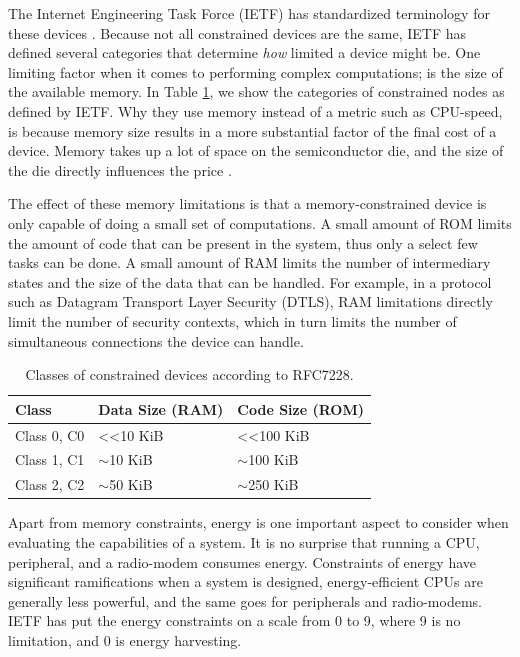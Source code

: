 The Internet Engineering Task Force (IETF) has standardized terminology for these devices \cite{rfc7228}. Because not all constrained devices are the same, IETF has defined several categories that determine \emph{how} limited a device might be. One limiting factor when it comes to performing complex computations; is the size of the available memory. In Table \ref{tab:constrained-classes}, we show the categories of constrained nodes as defined by IETF. Why they use memory instead of a metric such as CPU-speed, is because memory size results in a more substantial factor of the final cost of a device. Memory takes up a lot of space on the semiconductor die, and the size of the die directly influences the price \cite{koopman2015}.


The effect of these memory limitations is that a memory-constrained device is only capable of doing a small set of computations. A small amount of ROM limits the amount of code that can be present in the system, thus only a select few tasks can be done. A small amount of RAM limits the number of intermediary states and the size of the data that can be handled. For example, in a protocol such as Datagram Transport Layer Security (DTLS), RAM limitations directly limit the number of security contexts, which in turn limits the number of simultaneous connections the device can handle.

\begin{table}[ht]
\centering
\caption{Classes of constrained devices according to RFC7228.}
\label{tab:constrained-classes}
\begin{tabular}{lll}
\hline\hline
\textbf{Class}  & \textbf{Data Size (RAM)}  & \textbf{Code Size (ROM)}    \\ \hline
Class 0, C0 & \textless{}\textless 10 KiB & \textless{}\textless  100 KiB \\ 
Class 1, C1 & $\sim$10 KiB                & $\sim$100 KiB                 \\ 
Class 2, C2 & $\sim$50 KiB                & $\sim$250 KiB                 \\ \hline\hline
\end{tabular}
\end{table}


Apart from memory constraints, energy is one important aspect to consider when evaluating the capabilities of a system. It is no surprise that running a CPU, peripheral, and a radio-modem consumes energy. Constraints of energy have significant ramifications when a system is designed, energy-efficient CPUs are generally less powerful, and the same goes for peripherals and radio-modems. IETF has put the energy constraints on a scale from 0 to 9, where 9 is no limitation, and 0 is energy harvesting. 

